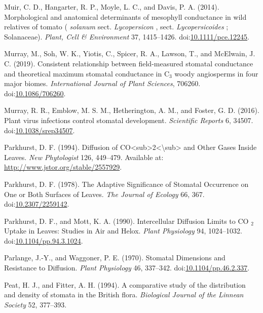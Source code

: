 \documentclass[utf8]{frontiersSCNS}
\begin{document}
\leavevmode\hypertarget{ref-muir_morphological_2014}{}%
Muir, C. D., Hangarter, R. P., Moyle, L. C., and Davis, P. A. (2014).
Morphological and anatomical determinants of mesophyll conductance in
wild relatives of tomato ( \emph{solanum} sect. \emph{Lycopersicon} ,
sect. \emph{Lycopersicoides} ; Solanaceae). \emph{Plant, Cell \&
Environment} 37, 1415--1426.
doi:\href{https://doi.org/10.1111/pce.12245}{10.1111/pce.12245}.

\leavevmode\hypertarget{ref-murray_consistent_2019}{}%
Murray, M., Soh, W. K., Yiotis, C., Spicer, R. A., Lawson, T., and
McElwain, J. C. (2019). Consistent relationship between field-measured
stomatal conductance and theoretical maximum stomatal conductance in
C\(_{\textrm{3}}\) woody angiosperms in four major biomes.
\emph{International Journal of Plant Sciences}, 706260.
doi:\href{https://doi.org/10.1086/706260}{10.1086/706260}.

\leavevmode\hypertarget{ref-murray_plant_2016}{}%
Murray, R. R., Emblow, M. S. M., Hetherington, A. M., and Foster, G. D.
(2016). Plant virus infections control stomatal development.
\emph{Scientific Reports} 6, 34507.
doi:\href{https://doi.org/10.1038/srep34507}{10.1038/srep34507}.

\leavevmode\hypertarget{ref-parkhurst_diffusion_1994}{}%
Parkhurst, D. F. (1994). Diffusion of
CO\textless sub\textgreater2\textless\textbackslash sub\textgreater{}
and Other Gases Inside Leaves. \emph{New Phytologist} 126, 449--479.
Available at: \url{http://www.jstor.org/stable/2557929}.

\leavevmode\hypertarget{ref-parkhurst_adaptive_1978}{}%
Parkhurst, D. F. (1978). The Adaptive Significance of Stomatal
Occurrence on One or Both Surfaces of Leaves. \emph{The Journal of
Ecology} 66, 367.
doi:\href{https://doi.org/10.2307/2259142}{10.2307/2259142}.

\leavevmode\hypertarget{ref-parkhurst_intercellular_1990}{}%
Parkhurst, D. F., and Mott, K. A. (1990). Intercellular Diffusion Limits
to CO \(_{\textrm{2}}\) Uptake in Leaves: Studies in Air and Helox.
\emph{Plant Physiology} 94, 1024--1032.
doi:\href{https://doi.org/10.1104/pp.94.3.1024}{10.1104/pp.94.3.1024}.

\leavevmode\hypertarget{ref-parlange_stomatal_1970}{}%
Parlange, J.-Y., and Waggoner, P. E. (1970). Stomatal Dimensions and
Resistance to Diffusion. \emph{Plant Physiology} 46, 337--342.
doi:\href{https://doi.org/10.1104/pp.46.2.337}{10.1104/pp.46.2.337}.

\leavevmode\hypertarget{ref-peat_comparative_1994}{}%
Peat, H. J., and Fitter, A. H. (1994). A comparative study of the
distribution and density of stomata in the British flora.
\emph{Biological Journal of the Linnean Society} 52, 377--393.
\end{document}
